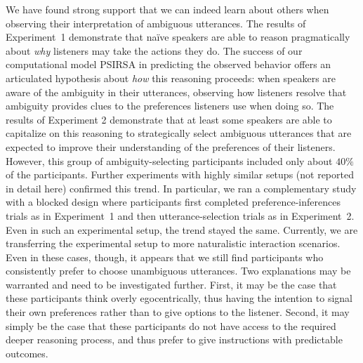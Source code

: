 \documentclass[10pt,a4paper]{article}
\newcommand{\gcs}[1]{\textcolor{blue}{[gcs: #1]}}
\begin{document}
We have found strong support that we can indeed learn about others when observing their interpretation of ambiguous utterances. 
The results of Experiment~1 demonstrate that na\"ive speakers are able to reason pragmatically about \emph{why} listeners may take the actions they do. 
The success of our computational model PSIRSA in predicting the observed behavior offers an articulated hypothesis about \emph{how} this reasoning proceeds: when speakers are aware of the ambiguity in their utterances, observing how listeners resolve that ambiguity provides clues to the preferences listeners use when doing so.
The results of Experiment 2 demonstrate that at least some speakers are able to capitalize on this reasoning to strategically select ambiguous utterances that are expected to improve their understanding of the preferences of their listeners.
However, this group of ambiguity-selecting participants included only about $40\%$ of the participants. 
Further experiments with highly similar setups (not reported in detail here) confirmed this trend. 
In particular, we ran a complementary study with a blocked design where participants first completed preference-inferences trials as in Experiment~1 and then utterance-selection trials as in Experiment~2. 
Even in such an experimental setup, the trend stayed the same. 
Currently, we are transferring the experimental setup to more naturalistic interaction scenarios. 
Even in these cases, though, it appears that we still find participants who consistently prefer to choose unambiguous utterances. 
Two explanations may be warranted and need to be investigated further. 
First, it may be the case that these participants think overly egocentrically, thus having the intention to signal their own preferences rather than to give options to the listener. 
Second, it may simply be the case that these participants do not have access to the required deeper reasoning process, and thus prefer to give instructions with predictable outcomes. 
\end{document}
